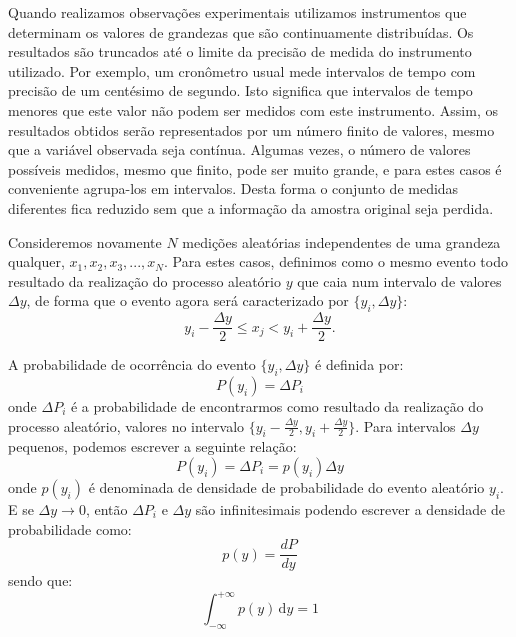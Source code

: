 
Quan\-do realizamos observações experimentais utilizamos instrumentos que determinam os valores de grandezas que são continuamente distribuídas. Os resultados são truncados até o limite da precisão de medida do instrumento utilizado. Por exemplo, um cronômetro usual mede intervalos de tempo com precisão de um centésimo de segundo. Isto significa que intervalos de tempo menores que este valor não podem ser medidos com este instrumento. Assim, os resultados obtidos serão representados por um número finito de valores, mesmo que a variável observada seja contínua. Algumas vezes, o número de valores possíveis medidos, mesmo que finito, pode ser muito grande, e para estes casos é conveniente agrupa-los em intervalos.  Desta forma o conjunto de medidas diferentes fica reduzido sem que a informação da amostra original seja perdida.

Consideremos novamente $N$ medições aleatórias independentes de uma grandeza qualquer, $x_1, x_2, x_3, ... , x_N$. Para estes casos, definimos como o mesmo evento todo resultado da realização do processo aleatório $y$ que caia num intervalo de valores $\Delta y$, de forma que o evento agora será caracterizado por $\{y_i, \Delta y\}$: 
\begin{equation}
y_i - \frac{\Delta y}{2} \leq x_j  < y_i + \frac{\Delta y}{2}.
\end{equation}

A probabilidade de ocorrência do evento $\{y_i, \Delta y \}$ é definida por:
\begin{equation}
P(y_i) = \Delta P_i
\end{equation}
\noindent
onde $\Delta P_i$ é a probabilidade de encontrarmos como resultado da realização do processo aleatório, valores no intervalo $\{y_i - \frac{\Delta y}{2}, y_i +	 \frac{\Delta y}{2}\}$. Para intervalos $\Delta y$ pequenos, podemos escrever a seguinte relação:
\begin{equation}
P(y_i) = \Delta P_i = p(y_i) \Delta y
\end{equation}
\noindent
onde $p(y_i)$ é denominada de densidade de probabilidade do evento aleatório $y_i$. E se $\Delta y \longrightarrow 0$, então $\Delta P_i$ e $\Delta y$ são infinitesimais podendo escrever a densidade de probabilidade como:
\begin{equation}
p(y) = \frac{dP}{dy}
\end{equation}
\noindent
sendo que: 
\begin{equation}
\int_{-\infty}^{+\infty} \! p(y) \, \mathrm{d}y = 1
\end{equation}
\noindent

